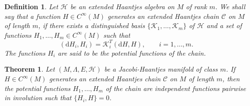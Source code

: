 \documentclass[10pt,a4paper]{amsart}
\newtheorem{definition}{Definition}
\newtheorem{theorem}{Theorem}
\newcommand{\beq}{\begin{equation}}
\newcommand{\bs}{\boldsymbol}
\newcommand{\eeq}{\end{equation}}
\newcommand{\rd}{\mathrm{d}}
\begin{document}
\begin{definition}
Let $\mathscr{H}$ be an extended Haantjes algebra on $M$ of rank $m$. We shall say that a function $H\in C^{\infty}(M)$ generates an extended Haantjes chain $\mathscr{C}$ on $M$ of length $m$, if  there exists a distinguished basis $\{\bs{\mathcal{K}}_1,\ldots, \bs{\mathcal{K}}_m\}$ of $\mathscr{H}$ and a set of functions $H_{1},\ldots,H_{m}\in C^{\infty}(M)$ such that
 \beq \label{eqHCportuguesa}
 (\rd H_{i}, H_{i})= \bs{\mathcal{K}}_i^{T}(\rd H,H), \qquad i=1,\ldots, m.
 \eeq
The functions $H_i$ are said to be the potential functions of the chain.
\end{definition}

\begin{theorem}
\label{themain}
Let $(M,\Lambda,E,\mathscr{H})$ be a Jacobi-Haantjes manifold of class $m$. If $H\in C^{\infty}(M)$ generates an extended Haantjes chain $\mathscr{C}$ on $M$ of length $m$,
then the potential functions $H_{1},\ldots,H_{m}$ of the chain are independent functions pairwise in involution such that $\lbrace H_{i},H\rbrace=0$. 
\end{theorem}
\end{document}
